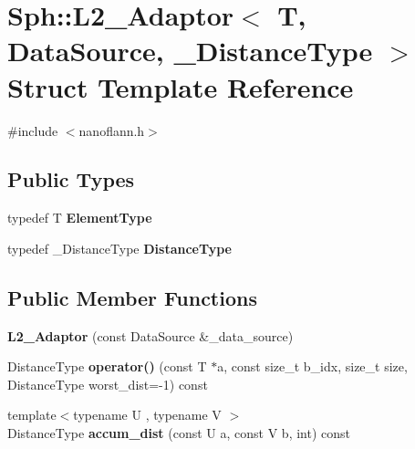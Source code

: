 \hypertarget{structSph_1_1L2__Adaptor}{}\section{Sph\+:\+:L2\+\_\+\+Adaptor$<$ T, Data\+Source, \+\_\+\+Distance\+Type $>$ Struct Template Reference}
\label{structSph_1_1L2__Adaptor}


{\ttfamily \#include $<$nanoflann.\+h$>$}

\subsection*{Public Types}
\begin{DoxyCompactItemize}
\item 
\hypertarget{structSph_1_1L2__Adaptor_a8ea959f5cbbd6a82995ca45f2057c7c4}{}\label{structSph_1_1L2__Adaptor_a8ea959f5cbbd6a82995ca45f2057c7c4} 
typedef T {\bfseries Element\+Type}
\item 
\hypertarget{structSph_1_1L2__Adaptor_a65e7df910b606d8aceb0266da3b10116}{}\label{structSph_1_1L2__Adaptor_a65e7df910b606d8aceb0266da3b10116} 
typedef \+\_\+\+Distance\+Type {\bfseries Distance\+Type}
\end{DoxyCompactItemize}
\subsection*{Public Member Functions}
\begin{DoxyCompactItemize}
\item 
\hypertarget{structSph_1_1L2__Adaptor_a78f6f6594fc4a3275554ae233c3efa6a}{}\label{structSph_1_1L2__Adaptor_a78f6f6594fc4a3275554ae233c3efa6a} 
{\bfseries L2\+\_\+\+Adaptor} (const Data\+Source \&\+\_\+data\+\_\+source)
\item 
\hypertarget{structSph_1_1L2__Adaptor_a0196461da1415c227e3223f81e64cb4f}{}\label{structSph_1_1L2__Adaptor_a0196461da1415c227e3223f81e64cb4f} 
Distance\+Type {\bfseries operator()} (const T $\ast$a, const size\+\_\+t b\+\_\+idx, size\+\_\+t size, Distance\+Type worst\+\_\+dist=-\/1) const
\item 
\hypertarget{structSph_1_1L2__Adaptor_aaa4d661ee568be026da00486645be5e2}{}\label{structSph_1_1L2__Adaptor_aaa4d661ee568be026da00486645be5e2} 
{\footnotesize template$<$typename U , typename V $>$ }\\Distance\+Type {\bfseries accum\+\_\+dist} (const U a, const V b, int) const
\end{DoxyCompactItemize}
